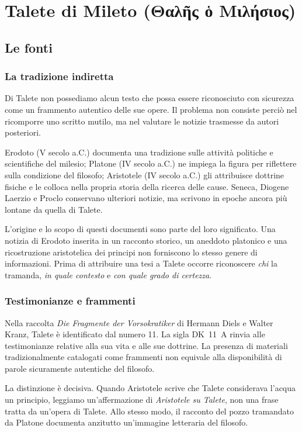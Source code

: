 \chapter{Talete di Mileto (Θαλῆς ὁ Μιλήσιος)}

\section{Le fonti}

\subsection{La tradizione indiretta}

Di Talete non possediamo alcun testo che possa essere riconosciuto con sicurezza come un frammento autentico delle sue opere. Il problema non consiste perciò nel ricomporre uno scritto mutilo, ma nel valutare le notizie trasmesse da autori posteriori.

Erodoto (V secolo a.C.) documenta una tradizione sulle attività politiche e scientifiche del milesio; Platone (IV secolo a.C.) ne impiega la figura per riflettere sulla condizione del filosofo; Aristotele (IV secolo a.C.) gli attribuisce dottrine fisiche e le colloca nella propria storia della ricerca delle cause. Seneca, Diogene Laerzio e Proclo conservano ulteriori notizie, ma scrivono in epoche ancora più lontane da quella di Talete.

L'origine e lo scopo di questi documenti sono parte del loro significato. Una notizia di Erodoto inserita in un racconto storico, un aneddoto platonico e una ricostruzione aristotelica dei principi non forniscono lo stesso genere di informazioni. Prima di attribuire una tesi a Talete occorre riconoscere \emph{chi} la tramanda, \emph{in quale contesto} e \emph{con quale grado di certezza}.

\subsection{Testimonianze e frammenti}

Nella raccolta \emph{Die Fragmente der Vorsokratiker} di Hermann Diels e Walter Kranz, Talete è identificato dal numero 11. La sigla DK~11~A rinvia alle testimonianze relative alla sua vita e alle sue dottrine. La presenza di materiali tradizionalmente catalogati come frammenti non equivale alla disponibilità di parole sicuramente autentiche del filosofo.

La distinzione è decisiva. Quando Aristotele scrive che Talete considerava l'acqua un principio, leggiamo un'affermazione di \emph{Aristotele su Talete}, non una frase tratta da un'opera di Talete. Allo stesso modo, il racconto del pozzo tramandato da Platone documenta anzitutto un'immagine letteraria del filosofo.

